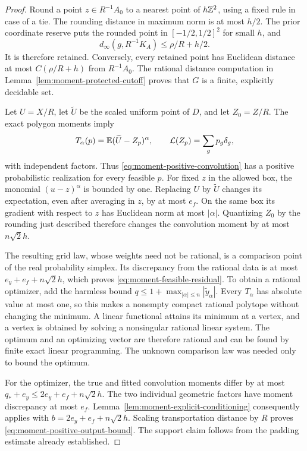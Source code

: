 \begin{proof}
Round a point $z\in R^{-1}A_0$ to a nearest point of $h\mathbb Z^2$,
using a fixed rule in case of a tie.  The rounding distance in
maximum norm is at most $h/2$.  The prior coordinate reserve puts
the rounded point in $[-1/2,1/2]^2$ for small $h$, and
\[
 d_\infty(g,R^{-1}K_A)\le\rho/R+h/2.
\]
It is therefore retained.  Conversely, every retained point has
Euclidean distance at most $C(\rho/R+h)$ from $R^{-1}A_0$.
The rational distance computation in
Lemma~\ref{lem:moment-protected-cutoff} proves that $G$ is a
finite, explicitly decidable set.

Let $U=X/R$, let $\widetilde U$ be the scaled uniform point of
$D$, and let $Z_0=Z/R$.  The exact polygon moments imply
\[
 T_\alpha(p)=\mathbb E(\widetilde U-Z_p)^\alpha,
 \qquad \mathcal L(Z_p)=\sum_gp_g\delta_g,
\]
with independent factors.  Thus \eqref{eq:moment-positive-convolution}
has a positive probabilistic realization for every feasible $p$.
For fixed $z$ in the allowed box, the monomial
$(u-z)^\alpha$ is bounded by one.  Replacing $U$ by
$\widetilde U$ changes its expectation, even after averaging in
$z$, by at most $e_f$.  On the same box its gradient with respect
to $z$ has Euclidean norm at most $|\alpha|$.  Quantizing $Z_0$
by the rounding just described therefore changes the convolution
moment by at most $n\sqrt2h$.

The resulting grid law, whose weights need not be rational, is a
comparison point of the real probability simplex.  Its discrepancy
from the rational data is at most $e_y+e_f+n\sqrt2h$, which
proves \eqref{eq:moment-feasible-residual}.  To obtain a rational
optimizer, add the harmless bound
$q\le1+\max_{|\alpha|\le n}|\widetilde y_\alpha|$.
Every $T_\alpha$ has absolute value at most one, so this makes a
nonempty compact rational polytope without changing the minimum.
A linear functional attains its minimum at a vertex, and a vertex
is obtained by solving a nonsingular rational linear system.
The optimum and an optimizing vector are therefore rational and
can be found by finite exact linear programming.  The unknown
comparison law was needed only to bound the optimum.

For the optimizer, the true and fitted convolution moments differ
by at most $q_*+e_y\le2e_y+e_f+n\sqrt2h$.  The two individual
geometric factors have moment discrepancy at most $e_f$.
Lemma~\ref{lem:moment-explicit-conditioning} consequently applies
with $b=2e_y+e_f+n\sqrt2h$.  Scaling transportation distance by
$R$ proves \eqref{eq:moment-positive-output-bound}.  The support
claim follows from the padding estimate already established.
\end{proof}

